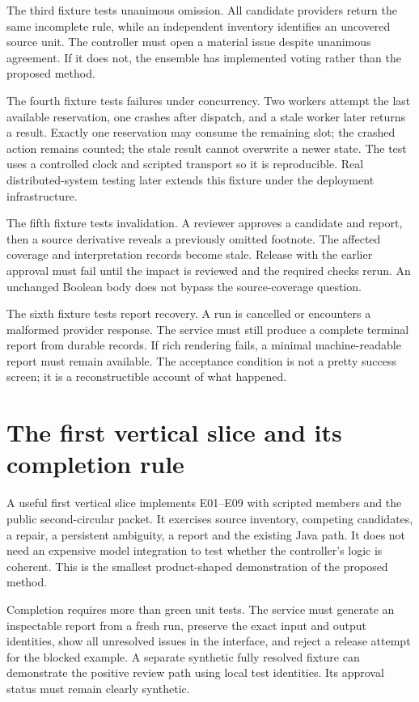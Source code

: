 \documentclass[12pt,a4paper,oneside,openany]{book}
\begin{document}
The third fixture tests unanimous omission. All candidate providers return the
same incomplete rule, while an independent inventory identifies an uncovered
source unit. The controller must open a material issue despite unanimous agreement.
If it does not, the ensemble has implemented voting rather than the proposed
method.

The fourth fixture tests failures under concurrency. Two workers attempt the last
available reservation, one crashes after dispatch, and a stale worker later
returns a result. Exactly one reservation may consume the remaining slot; the
crashed action remains counted; the stale result cannot overwrite a newer state.
The test uses a controlled clock and scripted transport so it is reproducible.
Real distributed-system testing later extends this fixture under the deployment
infrastructure.

The fifth fixture tests invalidation. A reviewer approves a candidate and report,
then a source derivative reveals a previously omitted footnote. The affected
coverage and interpretation records become stale. Release with the earlier
approval must fail until the impact is reviewed and the required checks rerun.
An unchanged Boolean body does not bypass the source-coverage question.

The sixth fixture tests report recovery. A run is cancelled or encounters a
malformed provider response. The service must still produce a complete terminal
report from durable records. If rich rendering fails, a minimal machine-readable
report must remain available. The acceptance condition is not a pretty success
screen; it is a reconstructible account of what happened.

\section{The first vertical slice and its completion rule}
\label{merge:M08:13}


A useful first vertical slice implements E01--E09 with scripted members and the
public second-circular packet. It exercises source inventory, competing candidates,
a repair, a persistent ambiguity, a report and the existing Java path. It does
not need an expensive model integration to test whether the controller's logic
is coherent. This is the smallest product-shaped demonstration of the proposed
method.

Completion requires more than green unit tests. The service must generate an
inspectable report from a fresh run, preserve the exact input and output identities,
show all unresolved issues in the interface, and reject a release attempt for the
blocked example. A separate synthetic fully resolved fixture can demonstrate the
positive review path using local test identities. Its approval status must remain
clearly synthetic.
\end{document}
